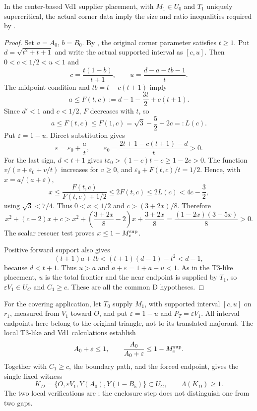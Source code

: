 \begin{lemma}
\label{lem:appendix-vd1-supported-tail}
In the center-based Vd1 supplier placement, with $M_1\in U_0$ and
$T_1$ uniquely supercritical, the actual corner data imply the size and
ratio inequalities required by .
\end{lemma}
\begin{proof}
Set $a=A_0$, $b=B_0$. By , the
original corner parameter satisfies $t\ge1$. Put
$d=\sqrt{t^2+t+1}$ and write the actual supported interval as $[c,u]$.
Then $0<c<1/2<u<1$ and
\[
 c=\frac{t(1-b)}{t+1},\qquad
 u=\frac{d-a-tb-1}{t}.
\]
The midpoint condition and $tb=t-c(t+1)$ imply
\[
 a\le F(t,c):=d-1-\frac{3t}{2}+c(t+1).
\]
Since $d'<1$ and $c<1/2$, $F$ decreases with $t$, so
\[
 a\le F(t,c)\le F(1,c)=\sqrt3-\frac52+2c=:L(c).
\]
Put $\varepsilon=1-u$. Direct substitution gives
\[
 \varepsilon=\varepsilon_0+\frac at,\qquad
 \varepsilon_0=\frac{2t+1-c(t+1)-d}{t}>0.
\]
For the last sign, $d<t+1$ gives
$t\varepsilon_0>(1-c)t-c\ge1-2c>0$.
The function $v/(v+\varepsilon_0+v/t)$ increases for $v\ge0$, and
$\varepsilon_0+F(t,c)/t=1/2$. Hence, with $x=a/(a+\varepsilon)$,
\[
 x\le\frac{F(t,c)}{F(t,c)+1/2}\le2F(t,c)\le2L(c)
 <4c-\frac32,
\]
using $\sqrt3<7/4$. Thus $0<x<1/2$ and $c>(3+2x)/8$. Therefore
\[
 x^2+(c-2)x+c>
 x^2+\left(\frac{3+2x}{8}-2\right)x+\frac{3+2x}{8}
 =\frac{(1-2x)(3-5x)}8>0.
\]
The scalar rescuer test  proves $x\le1-M_c^{\rm sup}$.

Positive forward support also gives
\[
 (t+1)a+tb<(t+1)(d-1)-t^2<d-1,
\]
because $d<t+1$. Thus $u>a$ and $a+\varepsilon=1+a-u<1$.
As in the T3-like placement, $u$ is the total frontier and the near
endpoint is supplied by $T_1$, so $\varepsilon V_1\in U_C$ and
$C_1\ge c$. These are all the common D hypotheses.
\end{proof}

For the covering application, let $T_0$ supply $M_1$, with supported
interval $[c,u]$ on $r_1$, measured from $V_1$ toward $O$, and put
$\varepsilon=1-u$ and $P_T=\varepsilon V_1$. All interval endpoints here
belong to the original triangle, not to its translated majorant.
The local T3-like and Vd1 calculations establish
\[
 A_0+\varepsilon\le1,\qquad
 \frac{A_0}{A_0+\varepsilon}\le1-M_c^{\rm sup}.
\]
Together with $C_1\ge c$, the boundary path, and the forced endpoint,
 gives the single fixed witness
\[
 K_D=\{O,\varepsilon V_1,Y(A_0),Y(1-B_5)\}\subset U_C,
 \qquad \Lambda(K_D)\ge1.
\]
The two local verifications are
;
the enclosure step does not distinguish one from two gaps.



